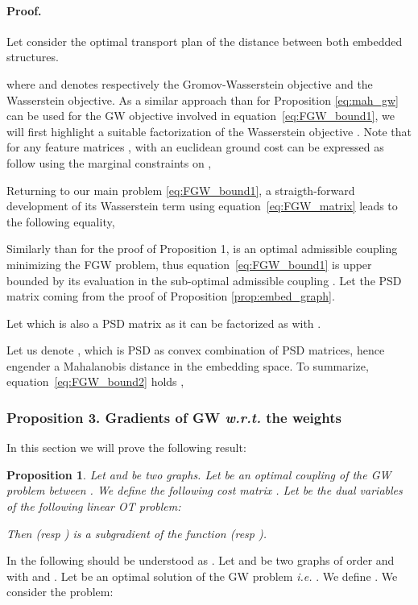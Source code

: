 \documentclass{article}
\def\eqref#1{equation~\ref{#1}}
\newtheorem{proposition}{Proposition}
\begin{document}
	\paragraph{Proof.}
	Let consider the optimal transport plan  of the  distance between both embedded structures.
	
	where  and  denotes respectively the Gromov-Wasserstein objective and the Wasserstein objective. 
	As a similar approach than for Proposition \ref{eq:mah_gw} can be used for the GW objective involved in \eqref{eq:FGW_bound1}, we will first highlight a suitable factorization of the Wasserstein objective . Note that for any feature matrices ,  with an euclidean ground cost can be expressed as follow using the marginal constraints on ,
	
	Returning to our main problem \ref{eq:FGW_bound1}, a straigth-forward development of its Wasserstein term  using \eqref{eq:FGW_matrix} leads to the following equality,
	
	Similarly than for the proof of Proposition 1,  is an optimal admissible coupling minimizing the FGW problem, thus \eqref{eq:FGW_bound1} is upper bounded by its evaluation in the sub-optimal admissible coupling . Let  the PSD matrix coming from the proof of Proposition \ref{prop:embed_graph}.
	
	Let   which is also a PSD matrix as it can be factorized as  with . 
	
	Let us denote ,  which is PSD  as convex combination of PSD matrices, hence engender a Mahalanobis distance in the embedding space. To summarize, \eqref{eq:FGW_bound2} holds ,
	

	\subsubsection{Proposition 3. Gradients of GW \textit{w.r.t.} the weights}
	In this section we will prove the following result:
	\begin{proposition}
		\label{grad_prop}
		{Let  and  be two graphs. Let  be an optimal coupling of the GW problem between . We define the following cost matrix . Let  be the dual variables of the following linear OT problem:}
		
		Then  (\textit{resp} ) is a subgradient of the function  (\textit{resp} ).
	\end{proposition}
	In the following  should be understood as . Let  and  be two graphs of order  and  with  and . Let  be an optimal solution of the GW problem \emph{i.e.} . We define . We consider the problem:
	
\end{document}
